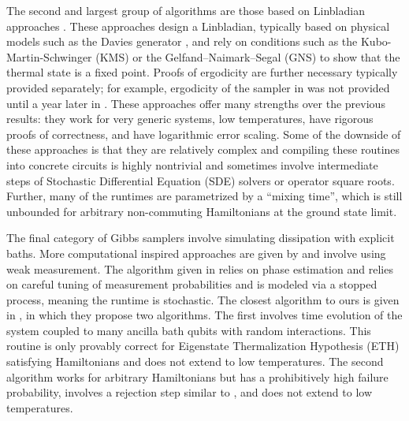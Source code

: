 \documentclass[11pt]{article}
\begin{document}
The second and largest group of algorithms are those based on Linbladian approaches \cite{chen2023quantumthermalstatepreparation, gilyen2024quantumgeneralizationsglaubermetropolis, ding2024efficientquantumgibbssamplers, ding2024single}. These approaches design a Linbladian, typically based on physical models such as the Davies generator \cite{davies1974markovian}, and rely on conditions such as the Kubo-Martin-Schwinger (KMS) or the Gelfand–Naimark–Segal (GNS) \cite{alicki1976detailed} to show that the thermal state is a fixed point. Proofs of ergodicity are further necessary typically provided separately; for example, ergodicity of the sampler in \cite{chen2023quantumthermalstatepreparation} was not provided until a year later in \cite{gilyen2024quantumgeneralizationsglaubermetropolis}. These approaches offer many strengths over the previous results: they work for very generic systems, low temperatures, have rigorous proofs of correctness, and have logarithmic error scaling. Some of the downside of these approaches is that they are relatively complex and compiling these routines into concrete circuits is highly nontrivial and sometimes involve intermediate steps of Stochastic Differential Equation (SDE) solvers or operator square roots. Further, many of the runtimes are parametrized by a ``mixing time'', which is still unbounded for arbitrary non-commuting Hamiltonians at the ground state limit.


The final category of Gibbs samplers involve simulating dissipation with explicit baths. More computational inspired approaches are given by \cite{zhang2023dissipative,jiang2024quantummetropolissamplingweak} and involve using weak measurement. The algorithm given in \cite{jiang2024quantummetropolissamplingweak} relies on phase estimation and \cite{zhang2023dissipative} relies on careful tuning of measurement probabilities and is modeled via a stopped process, meaning the runtime is stochastic. The closest algorithm to ours is given in \cite{shtanko2023preparingthermalstatesnoiseless}, in which they propose two algorithms. The first involves time evolution of the system coupled to many ancilla bath qubits with random interactions. This routine is only provably correct for Eigenstate Thermalization Hypothesis (ETH) satisfying Hamiltonians and does not extend to low temperatures. The second algorithm works for arbitrary Hamiltonians but has a prohibitively high failure probability, involves a rejection step similar to \cite{temme2011}, and does not extend to low temperatures.
\end{document}
